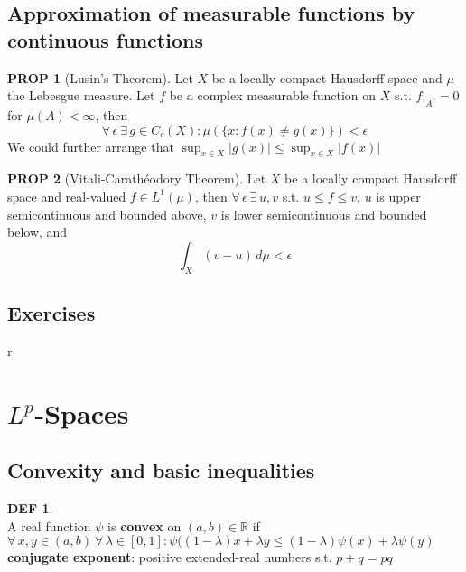 \documentclass[hidelinks,10pt]{article}
\theoremstyle{definition}
\newtheorem*{defin}{DEF}
\theoremstyle{dotles}
\newenvironment{exercise}[1]
  {\renewcommand\theinnercustomex{#1}\innercustomex}
  {\endinnercustomex}
\theoremstyle{dotless}
\newtheorem{proposition}{PROP}[section]
\theoremstyle{remark}
\begin{document}
\subsection{Approximation of measurable functions by continuous functions}

\begin{proposition}[Lusin's Theorem]Let $X$ be a locally compact Hausdorff space and $\mu$ the Lebesgue measure. Let $f$ be a complex measurable function on $X$ s.t. $f|_{A^c}=0$ for $\mu(A)<\infty$, then
\[\forall\,\epsilon\ \exists\,g\in C_c(X):\mu(\{x:f(x)\neq g(x)\})<\epsilon\]
We could further arrange that $\sup_{x\in X}|g(x)|\leq\sup_{x\in X}|f(x)|$
\end{proposition}

\begin{proposition}[Vitali-Carathéodory Theorem]Let $X$ be a locally compact Hausdorff space and real-valued $f\in L^1(\mu)$, then $\forall\,\epsilon\ \exists\,u,v$ s.t. $u\leq f\leq v$, $u$ is upper semicontinuous and bounded above, $v$ is lower semicontinuous and bounded below, and
\[\int_X(v-u)\,d\mu<\epsilon\]
\end{proposition}

\subsection*{Exercises}

\begin{exercise}{2.1}
r
\end{exercise}

\newpage

\section{$L^p$-Spaces}

\subsection{Convexity and basic inequalities}

\begin{defin}~\\
A real function $\psi$ is \textbf{convex} on $(a,b)\in\overline{\mathbb{R}}$ if $\forall\,x,y\in(a,b)\ \forall\,\lambda\in[0,1]:\psi((1-\lambda)x+\lambda y\leq(1-\lambda)\psi(x)+\lambda\psi(y)$\bigbreak
\textbf{conjugate exponent}: positive extended-real numbers s.t. $p+q=pq$
\end{defin}
\end{document}
